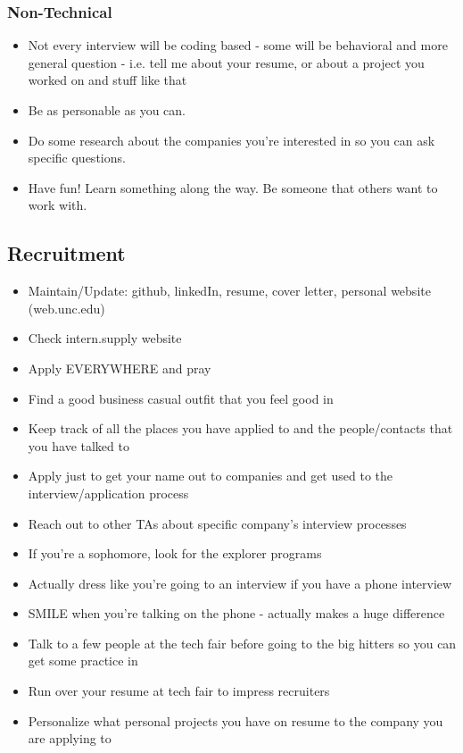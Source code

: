 \documentclass[a4paper]{article}
\begin{document}
\begin{itemize}
\subsubsection{Non-Technical}
\begin{itemize}
\item Not every interview will be coding based - some will be behavioral and more general question - i.e. tell me about your resume, or about a project you worked on and stuff like that
\item Be as personable as you can.
\item Do some research about the companies you’re interested in so you can ask specific questions.
\item Have fun! Learn something along the way. Be someone that others want to work with.
\end{itemize}
\end{itemize}
\subsection{Recruitment}
\begin{itemize}
\item Maintain/Update: github, linkedIn, resume, cover letter, personal website (web.unc.edu)
\item Check intern.supply website 
\item Apply EVERYWHERE and pray
\item Find a good business casual outfit that you feel good in 
\item Keep track of all the places you have applied to and the people/contacts that you have talked to
\item Apply just to get your name out to companies and get used to the interview/application process
\item Reach out to other TAs about specific company’s interview processes
\item If you’re a sophomore, look for the explorer programs
\item Actually dress like you’re going to an interview if you have a phone interview
\item SMILE when you’re talking on the phone - actually makes a huge difference
\item Talk to a few people at the tech fair before going to the big hitters so you can get some practice in
\item Run over your resume at tech fair to impress recruiters
\item Personalize what personal projects you have on resume to the company you are applying to
\end{itemize}
\end{document}
